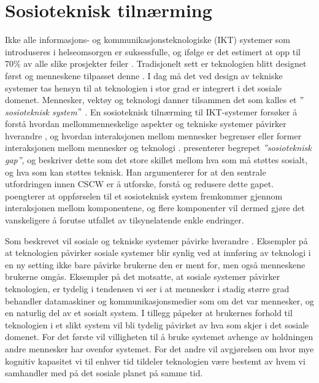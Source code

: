 \section{Sosioteknisk tilnærming}
\label{section:sosioteknisk}

Ikke alle informasjons- og kommunikasjonsteknologiske (IKT) systemer som introduseres i helseomsorgen er suksessfulle, og ifølge \citet{FITT} er det estimert at opp til 70\% av alle slike prosjekter feiler \citep{Coiera07}. Tradisjonelt sett er teknologien blitt designet først og menneskene tilpasset denne \citep{Appelbaum97}.
I dag må det ved design av tekniske systemer tas hensyn til at teknologien i stor grad er integrert i det sosiale domenet. Mennesker, vektøy og teknologi danner tilsammen det som kalles et \textit{$"$sosioteknisk system$"$} \citep{Coiera04}.
En sosioteknisk tilnærming til IKT-systemer forsøker å forstå hvordan mellommenneskelige aspekter og tekniske systemer påvirker hverandre \citep{Coiera04}, og hvordan interaksjonen mellom mennesker begrenser eller former interaksjonen mellom mennesker og teknologi \citep{Coiera07}. \citet{Ackerman00} presenterer begrepet \textit{”sosioteknisk gap”}, og beskriver dette som det store skillet mellom hva som må støttes sosialt, og hva som kan støttes teknisk. Han argumenterer for at den sentrale utfordringen innen CSCW er å utforske, forstå og redusere dette gapet. \citet{Coiera04} poengterer at oppførselen til et sosioteknisk system fremkommer gjennom interaksjonen mellom komponentene, og flere komponenter vil dermed gjøre det vanskeligere å forutse utfallet av tilsynelatende enkle endringer. 

\noindent
Som beskrevet vil sosiale og tekniske systemer påvirke hverandre \citep{Coiera04}. Eksempler på at teknologien påvirker sosiale systemer blir synlig ved at innføring av teknologi i en ny setting ikke bare påvirke brukerne den er ment for, men også menneskene brukerne omgås. Eksempler på det motsatte, at sosiale systemer påvirker teknologien, er tydelig i tendensen vi ser i at mennesker i stadig større grad behandler datamaskiner og kommunikasjonsmedier som om det var mennesker, og en naturlig del av et sosialt system. I tillegg påpeker \citet{Coiera07} at brukernes forhold til teknologien i et slikt system vil bli tydelig påvirket av hva som skjer i det sosiale domenet. For det første vil villigheten til å bruke systemet avhenge av holdningen andre mennesker har ovenfor systemet. For det andre vil avgjørelsen om hvor mye kognitiv kapasitet vi til enhver tid tildeler teknologien være bestemt av hvem vi samhandler med på det sosiale planet på samme tid.

